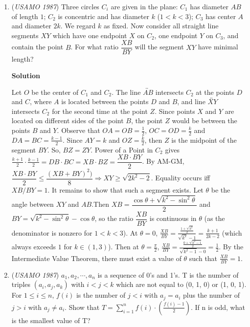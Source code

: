 \begin{enumerate}
 The proof is done by an induction.

 J.Z.

 


	\item (\textit{USAMO 1987}) Three circles $C_i$ are given in the plane: $C_1$ has diameter $AB$ of length $1$; $C_2$ is concentric and has diameter $k$ ($1<k<3$); $C_3$ has center $A$ and diameter $2k$. We regard $k$ as fixed. Now consider all straight line segments $XY$ which have one endpoint $X$ on $C_2$, one endpoint $Y$ on $C_3$, and contain the point $B$. For what ratio $\dfrac{XB}{BY}$ will the segment $XY$ have minimal length?


 



\textbf{Solution}

Let $O$ be the center of $C_1$ and $C_2$. The line $\overleftrightarrow{AB}$ intersects $C_2$ at the points $D$ and $C$, where $A$ is located between the points $D$ and $B$, and line $\overleftrightarrow{XY}$ intersects $C_2$ for the second time at the point $Z$. Since points $X$ and $Y$ are located on different sides of the point $B$, the point $Z$ would be between the points $B$ and $Y$. Observe that $OA=OB=\frac{1}{2}$, $OC=OD=\frac{k}{2}$ and $DA=BC=\frac{k-1}{2}$. Since $AY=k$ and $OZ=\frac{k}{2}$, then $Z$ is the midpoint of the segment $BY$. So, $BZ=ZY$. Power of a Point in $C_2$ gives $\frac{k+1}{2}\cdot \frac{k-1}{2}=DB\cdot BC=XB\cdot BZ=\dfrac{XB\cdot BY}{2}$. By AM-GM, $\dfrac{XB\cdot BY}{2}\le\dfrac{(XB+BY)^2)}{8}\Rightarrow XY\geq\sqrt{2k^2-2}$. Equality occurs iff $XB/BY=1$. It remains to show that such a segment exists.  Let $\theta$ be the angle between $XY$ and $AB$.Then $XB=\dfrac{\cos\theta+\sqrt{k^2-\sin^2\theta}}{2}$ and $BY=\sqrt{k^2-\sin^2\theta}-\cos\theta$, so the ratio $\dfrac{XB}{BY}$ is continuous in $\theta$ (as the denominator is nonzero for $1<k<3$). At $\theta=0$, $\frac{XB}{BY}=\frac{\frac{1+\sqrt{k^2}}{2}}{\sqrt{k^2}-1}=\frac{k+1}{2k-2}$ (which always exceeds $1$ for $k\in (1,3)$). Then at $\theta=\frac{\pi}{2}$, $\frac{XB}{BY}=\frac{\frac{0+\sqrt{k^2-1}}{2}}{\sqrt{k^2-1}-0}=\frac{1}{2}$. By the Intermediate Value Theorem, there must exist a value of $\theta$ such that $\frac{XB}{BY}=1$.

 


	\item (\textit{USAMO 1987}) $a_1, a_2, \cdots, a_n$ is a sequence of 0's and 1's. T is the number of triples $(a_i, a_j, a_k)$ with $i<j<k$ which are not equal to (0, 1, 0) or (1, 0, 1). For $1\le i\le n$, $f(i)$ is the number of $j<i$ with $a_j = a_i$ plus the number of $j>i$ with $a_j\neq a_i$. Show that $T=\sum_{i=1}^n f(i)\cdot\left(\frac{f(i)-1}2\right)$. If n is odd, what is the smallest value of T?



\end{enumerate}
